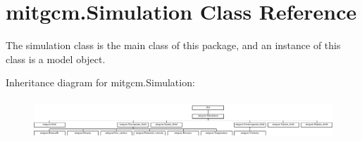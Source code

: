 \hypertarget{classmitgcm_1_1Simulation}{}\section{mitgcm.\+Simulation Class Reference}
\label{classmitgcm_1_1Simulation}


The simulation class is the main class of this package, and an instance of this class is a model object.  


Inheritance diagram for mitgcm.\+Simulation\+:\begin{figure}[H]
\begin{center}
\leavevmode
\includegraphics[height=1.490353cm]{classmitgcm_1_1Simulation}
\end{center}
\end{figure}
